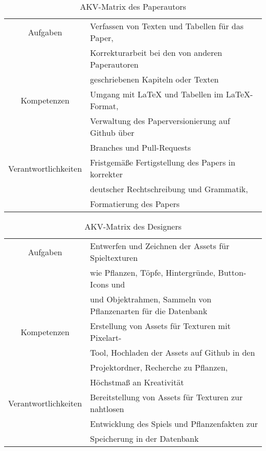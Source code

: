 \begin{table}[H]
    \begin{center}
        \label{tab:paperautor}
        \begin{tabular}{|c||p{9cm}|}
            \hline
            Aufgaben & Verfassen von Texten und Tabellen für das Paper, \\
            & Korrekturarbeit bei den von anderen Paperautoren \\
            & geschriebenen Kapiteln oder Texten \\
            \hline
            Kompetenzen & Umgang mit LaTeX und Tabellen im LaTeX-Format, \\
            & Verwaltung des Paperversionierung auf Github über \\
            & Branches und Pull-Requests \\
            \hline
            Verantwortlichkeiten & Fristgemäße Fertigstellung des Papers in korrekter \\
            & deutscher Rechtschreibung und Grammatik, \\
            & Formatierung des Papers \\
            \hline
        \end{tabular}
        \caption{AKV-Matrix des Paperautors}
    \end{center}
\end{table}
\begin{table}[H]
    \begin{center}
        \label{tab:designer}
        \begin{tabular}{|c||p{9cm}|}
            \hline
            Aufgaben & Entwerfen und Zeichnen der Assets für Spieltexturen \\
            & wie Pflanzen, Töpfe, Hintergründe, Button-Icons und \\
            & und Objektrahmen, Sammeln von Pflanzenarten für die Datenbank \\
            \hline
            Kompetenzen & Erstellung von Assets für Texturen mit Pixelart- \\
            & Tool, Hochladen der Assets auf Github in den \\
            & Projektordner, Recherche zu Pflanzen, \\
            & Höchstmaß an Kreativität \\
            \hline
            Verantwortlichkeiten & Bereitstellung von Assets für Texturen zur nahtlosen \\
            & Entwicklung des Spiels und Pflanzenfakten zur \\
            & Speicherung in der Datenbank \\
            \hline
        \end{tabular}
        \caption{AKV-Matrix des Designers}
    \end{center}
\end{table}

